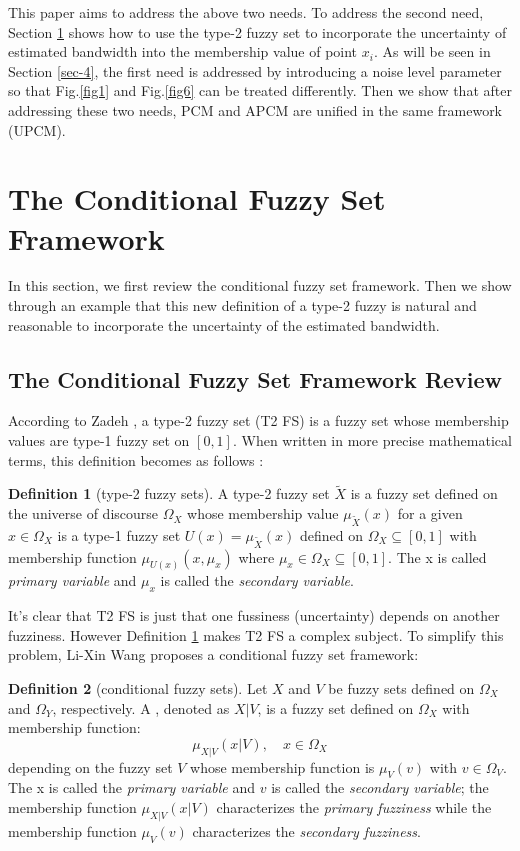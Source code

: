 \documentclass[journal]{IEEEtran}
\theoremstyle{definition}
\newtheorem{definition}{Definition}
\begin{document}
This paper aims to address the above two needs. 
To address the second need, Section \ref{sec-3} shows how to use the type-2 fuzzy set to incorporate the uncertainty of estimated bandwidth into the membership value of point $x_i$. As will be seen in Section \ref{sec-4}, the first need is addressed by introducing a noise level parameter so that Fig.\ref{fig1} and Fig.\ref{fig6} can be treated differently. Then we show that after addressing these two needs, PCM and APCM are unified in the same framework (UPCM).
\section{The Conditional Fuzzy Set Framework}
\label{sec-3}
In this section, we first review the conditional fuzzy set framework. Then we show through an example that this new definition of a type-2 fuzzy is natural and reasonable to incorporate the uncertainty of the estimated bandwidth.
\subsection{The Conditional Fuzzy Set Framework Review}
\label{sec-3-1}
According to Zadeh \cite{zadeh_concept_1975}, a type-2 fuzzy set (T2 FS) is a fuzzy set whose membership values are type-1 fuzzy set on $[0,1]$. When written in more precise mathematical terms,  this definition becomes as follows \cite{wang_new_2016}:

\begin{definition}[type-2 fuzzy sets]
\label{type2-fs}
A type-2 fuzzy set $\tilde{X}$ is a fuzzy set defined on the universe of discourse $\Omega_X$ whose membership value $\mu_\tilde{X}(x)$ for a given $x\in\Omega_X$ is a type-1 fuzzy set  $U(x)=\mu_\tilde{X}(x)$ defined on $\Omega_X\subseteq[0,1]$ with membership function $\mu_{U(x)}(x,\mu_x)$ where $\mu_x\in\Omega_X\subseteq[0,1]$. The x is called \emph{primary variable} and $\mu_x$ is called the \emph{secondary variable}.
\end{definition}

It's clear that T2 FS is just that one fussiness (uncertainty) depends on another fuzziness. However Definition \ref{type2-fs} makes T2 FS a complex subject. To simplify this problem, Li-Xin Wang \cite{wang_new_2016} proposes a conditional fuzzy set framework:

\begin{definition}[conditional fuzzy sets]
\label{conditional-fs}
Let $X$ and $V$ be fuzzy sets defined on $\Omega_X$ and $\Omega_Y$, respectively. A , denoted as $X|V$, is a fuzzy set defined on $\Omega_X$ with membership function:
\begin{equation}
\mu_{X|V}(x|V),\quad  x\in\Omega_X
\end{equation}
depending on the fuzzy set $V$ whose membership function is $\mu_V(v)$ with $v\in\Omega_V$. The x is called the \emph{primary variable} and $v$ is called the \emph{secondary variable}; the membership function $\mu_{X|V}(x|V)$ characterizes the \emph{primary fuzziness} while the membership function $\mu_V(v)$ characterizes the \emph{secondary fuzziness}.
\end{definition}
\end{document}
